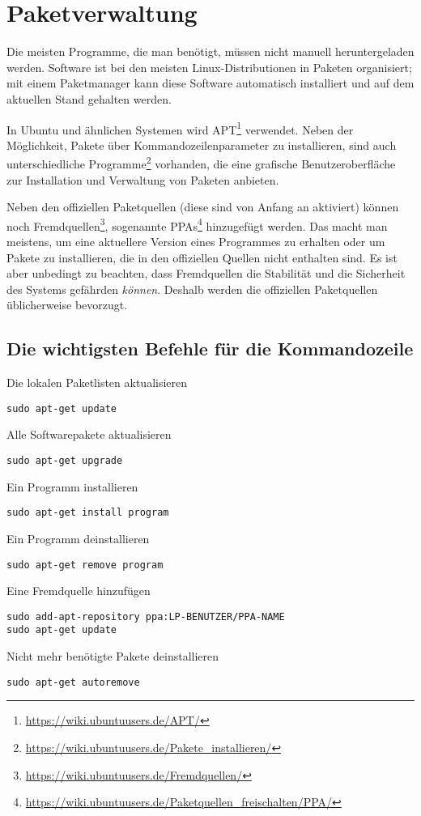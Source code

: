 \section{Paketverwaltung}

Die meisten Programme, die man benötigt, müssen nicht manuell heruntergeladen werden. Software ist bei den meisten Linux-Distributionen in Paketen organisiert; mit einem Paketmanager kann diese Software automatisch installiert und auf dem aktuellen Stand gehalten werden.

In Ubuntu und ähnlichen Systemen wird APT\footnote{\url{https://wiki.ubuntuusers.de/APT/}} verwendet. Neben der Möglichkeit, Pakete über Kommandozeilenparameter zu installieren, sind auch unterschiedliche Programme\footnote{\url{https://wiki.ubuntuusers.de/Pakete\_installieren/}} vorhanden, die eine grafische Benutzeroberfläche zur Installation und Verwaltung von Paketen anbieten.

Neben den offiziellen Paketquellen (diese sind von Anfang an aktiviert) können noch Fremdquellen\footnote{\url{https://wiki.ubuntuusers.de/Fremdquellen/}}, sogenannte PPAs\footnote{\url{https://wiki.ubuntuusers.de/Paketquellen_freischalten/PPA/}} hinzugefügt werden. Das macht man meistens, um eine aktuellere Version eines Programmes zu erhalten oder um Pakete zu installieren, die in den offiziellen Quellen nicht enthalten sind. Es ist aber unbedingt zu beachten, dass Fremdquellen die Stabilität und die Sicherheit des Systems gefährden \emph{können}. Deshalb werden die offiziellen Paketquellen üblicherweise bevorzugt.

\subsection{Die wichtigsten Befehle für die Kommandozeile}
\begin{multicols}{2}
Die lokalen Paketlisten aktualisieren
\begin{lstlisting}
sudo apt-get update
\end{lstlisting}

Alle Softwarepakete aktualisieren
\begin{lstlisting}
sudo apt-get upgrade
\end{lstlisting}
\end{multicols}

\begin{multicols}{2}
Ein Programm installieren
\begin{lstlisting}
sudo apt-get install program
\end{lstlisting}

Ein Programm deinstallieren
\begin{lstlisting}
sudo apt-get remove program
\end{lstlisting}
\end{multicols}

\begin{multicols}{2}
Eine Fremdquelle hinzufügen
\begin{lstlisting}
sudo add-apt-repository ppa:LP-BENUTZER/PPA-NAME
sudo apt-get update
\end{lstlisting}

\columnbreak

Nicht mehr benötigte Pakete deinstallieren
\begin{lstlisting}
sudo apt-get autoremove
\end{lstlisting}
\end{multicols}
